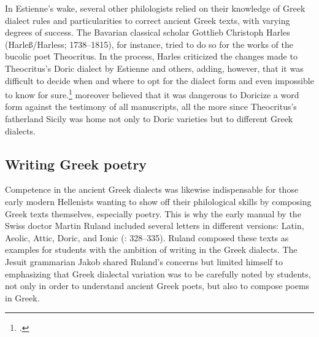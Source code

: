 In Estienne’s wake, several other philologists relied on their knowledge of Greek dialect rules and particularities to correct ancient Greek texts, with varying degrees of success. The Bavarian classical scholar Gottlieb Christoph Harles (Harleß/Harless; 1738–1815), for instance, tried to do so for the works of the bucolic poet Theocritus. In the process, Harles criticized the changes made to Theocritus’s Doric dialect by Estienne and others, adding, however, that it was difficult to decide when and where to opt for the dialect form and even impossible to know for sure.\footnote{\citet[\textsc{xxii–xxiv}]{Harles1780}.} \citet[\textsc{xxxi–xxxii}]{Harles1780} moreover believed that it was dangerous to Doricize a word form against the testimony of all manuscripts, all the more since Theocritus’s fatherland Sicily was home not only to Doric varieties but to different Greek dialects.

\subsection{Writing Greek poetry}

Competence in the ancient Greek dialects was likewise indispensable for those early modern Hellenists wanting to show off their philological skills by composing Greek texts themselves, especially poetry. This is why the early manual by the Swiss doctor Martin Ruland included several letters in different versions: Latin, Aeolic, Attic, Doric, and Ionic (\citealt{Ruland1556}: 328–335). Ruland composed these texts as examples for students with the ambition of writing in the Greek dialects. The Jesuit grammarian Jakob \citet[35]{Gretser1593} shared Ruland’s concerns but limited himself to emphasizing that Greek dialectal variation was to be carefully noted by students, not only in order to understand ancient Greek poets, but also to compose poems in Greek.

